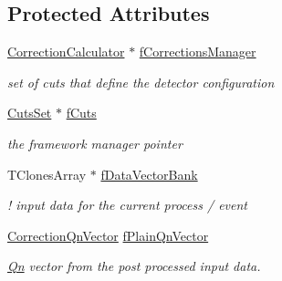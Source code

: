 \subsection*{Protected Attributes}
\begin{DoxyCompactItemize}
\item 
\mbox{\label{classQn_1_1DetectorConfiguration_a247561be3576d9e7ed644da70dc4f4b6}} 
\mbox{\hyperlink{classQn_1_1CorrectionCalculator}{Correction\+Calculator}} $\ast$ \mbox{\hyperlink{classQn_1_1DetectorConfiguration_a247561be3576d9e7ed644da70dc4f4b6}{f\+Corrections\+Manager}}
\begin{DoxyCompactList}\small\item\em set of cuts that define the detector configuration \end{DoxyCompactList}\item 
\mbox{\label{classQn_1_1DetectorConfiguration_ab1deed09e33f525995c05e44df64efe2}} 
\mbox{\hyperlink{classQn_1_1CutsSet}{Cuts\+Set}} $\ast$ \mbox{\hyperlink{classQn_1_1DetectorConfiguration_ab1deed09e33f525995c05e44df64efe2}{f\+Cuts}}
\begin{DoxyCompactList}\small\item\em the framework manager pointer \end{DoxyCompactList}\item 
\mbox{\label{classQn_1_1DetectorConfiguration_a2e9cf77ef7a6c224efe1a6ac54a588fe}} 
T\+Clones\+Array $\ast$ \mbox{\hyperlink{classQn_1_1DetectorConfiguration_a2e9cf77ef7a6c224efe1a6ac54a588fe}{f\+Data\+Vector\+Bank}}
\begin{DoxyCompactList}\small\item\em ! input data for the current process / event \end{DoxyCompactList}\item 
\mbox{\label{classQn_1_1DetectorConfiguration_a208a2442ee47a87720a41d32c80b1cb9}} 
\mbox{\hyperlink{classQn_1_1CorrectionQnVector}{Correction\+Qn\+Vector}} \mbox{\hyperlink{classQn_1_1DetectorConfiguration_a208a2442ee47a87720a41d32c80b1cb9}{f\+Plain\+Qn\+Vector}}
\begin{DoxyCompactList}\small\item\em \mbox{\hyperlink{namespaceQn}{Qn}} vector from the post processed input data. \end{DoxyCompactList}\item 

\end{DoxyCompactItemize}
